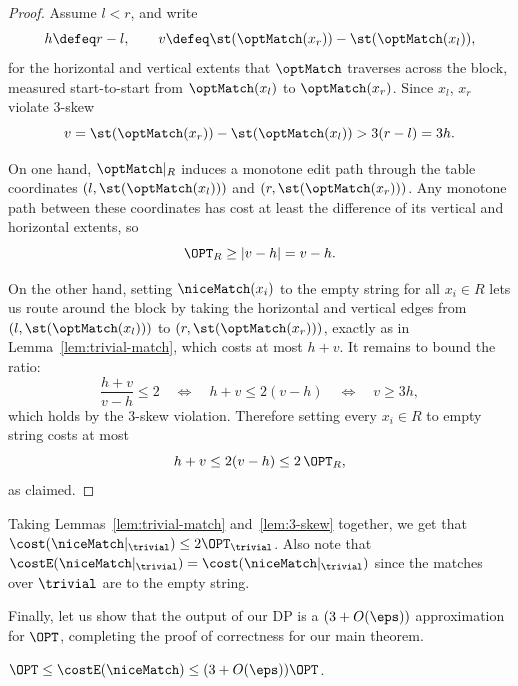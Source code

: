 \begin{proof}
    Assume $l < r$, and write
    \[
        h \defeq r - l,
        \qquad
        v \defeq \st(\optMatch(x_r)) - \st(\optMatch(x_l)),
    \]
    for the horizontal and vertical extents that $\optMatch$ traverses across the
    block, measured start-to-start from $\optMatch(x_l)$ to $\optMatch(x_r)$.
    Since $x_l$, $x_r$ violate $3$-skew
    \[
        v = \st(\optMatch(x_r)) - \st(\optMatch(x_l)) > 3(r - l) = 3 h.
    \]

    On one hand, $\optMatch|_R$ induces a monotone edit path through the table
    coordinates $(l, \st(\optMatch(x_l)))$ and $(r, \st(\optMatch(x_r)))$. Any monotone
    path between these coordinates has cost at least the difference of its vertical and
    horizontal extents, so
    \[
        \OPT_R \geq |v - h| = v - h.
    \]

    On the other hand, setting $\niceMatch(x_i)$ to the empty string for all $x_i \in R$ lets us route
    around the block by taking the horizontal and vertical edges from
    $(l, \st(\optMatch(x_l)))$ to $(r, \st(\optMatch(x_r)))$, exactly as in
    Lemma~\ref{lem:trivial-match}, which costs at most $h + v$. It remains to bound the
    ratio:
    \[
        \frac{h + v}{v - h} \leq 2
        \quad\Longleftrightarrow\quad
        h + v \leq 2(v - h)
        \quad\Longleftrightarrow\quad
        v \geq 3 h,
    \]
    which holds by the $3$-skew violation. Therefore setting every $x_i \in R$ to empty string
    costs at most
    \[
        h + v \leq 2(v - h) \leq 2\,\OPT_R,
    \]
    as claimed.
\end{proof}

Taking Lemmas~\ref{lem:trivial-match} and~\ref{lem:3-skew} together, we get that $\cost(\niceMatch|_{\trivial}) \leq 2\OPT_{\trivial}$. Also note that $\costE(\niceMatch|_{\trivial}) = \cost(\niceMatch|_{\trivial})$ since the matches over $\trivial$ are to the empty string.

Finally, let us show that the output of our DP is a $(3+O(\eps))$ approximation for $\OPT$, completing the proof of correctness for our main theorem.

\begin{lemma}
    \label{lem:total-approx}
    $\OPT \leq \costE(\niceMatch) \leq (3+O(\eps))\OPT$.
\end{lemma}

